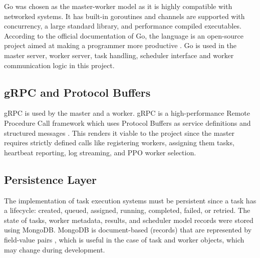 Go was chosen as the master-worker model as it is highly compatible with networked systems. It has built-in goroutines and channels are supported with concurrency, a large standard library, and performance compiled executables. According to the official documentation of Go, the language is an open-source project aimed at making a programmer more productive \cite{godocs}. Go is used in the master server, worker server, task handling, scheduler interface and worker communication logic in this project.

\subsection{gRPC and Protocol Buffers}

gRPC is used by the master and a worker. gRPC is a high-performance Remote Procedure Call framework which uses Protocol Buffers as service definitions and structured messages \cite{grpcintro}. This renders it viable to the project since the master requires strictly defined calls like registering workers, assigning them tasks, heartbeat reporting, log streaming, and PPO worker selection.

\subsection{Persistence Layer}

The implementation of task execution systems must be persistent since a task has a lifecycle: created, queued, assigned, running, completed, failed, or retried. The state of tasks, worker metadata, results, and scheduler model records were stored using MongoDB. MongoDB is document-based (records) that are represented by field-value pairs \cite{mongodbdocs}, which is useful in the case of task and worker objects, which may change during development.
